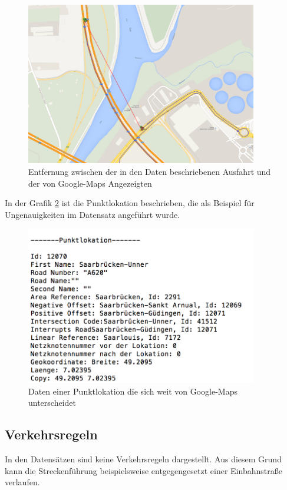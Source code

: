 \documentclass[12pt, a4paper, ngerman]{article}
\begin{document}
\begin{figure}[htbp] 
  \centering
     \includegraphics[width=0.9\textwidth]{Grafiken/entfernung.png}
  \caption{Entfernung zwischen der in den Daten beschriebenen Ausfahrt und der von Google-Maps Angezeigten}
  \label{fig:entfernungabfahrt}
\end{figure}

In der Grafik \ref{fig:entfernungabfahrtplk} ist die Punktlokation beschrieben, die als Beispiel für Ungenauigkeiten im Datensatz angeführt wurde.

\begin{figure}[htbp] 
  \centering
     \includegraphics[width=0.9\textwidth]{Grafiken/punklokationentfernung.png}
  \caption{Daten einer Punktlokation die sich weit von Google-Maps unterscheidet}
  \label{fig:entfernungabfahrtplk}
\end{figure}




\subsection{Verkehrsregeln}
In den Datensätzen sind keine Verkehrsregeln dargestellt. Aus diesem Grund kann die Streckenführung beispielsweise entgegengesetzt einer Einbahnstraße verlaufen.
\end{document}
